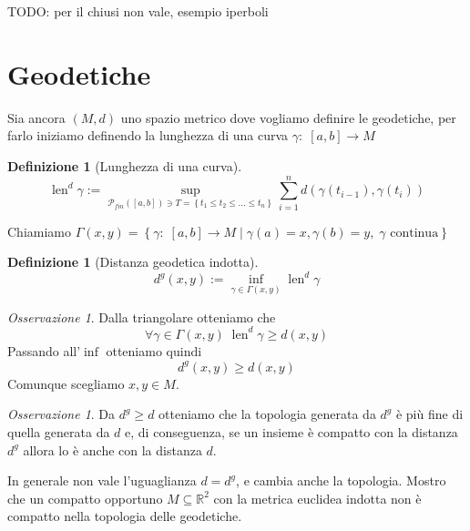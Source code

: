 \documentclass[a4paper,10pt]{article}
\newcounter{counter1}
\theoremstyle{plain}
\theoremstyle{definition}
\newtheorem{mydef}[counter1]{Definizione}
\theoremstyle{remark}
\newtheorem{myoss}[counter1]{Osservazione}
\newcommand{\set}[1]{\left\{#1\right\}}
\newcommand{\pa}[1]{\left(#1\right)}
\newcommand{\bra}[1]{\left[#1\right]}
\DeclareMathOperator{\len}{len}
\begin{document}
TODO: per il chiusi non vale, esempio iperboli


\section{Geodetiche}

Sia ancora $(M,d)$ uno spazio metrico dove vogliamo definire le
geodetiche, per farlo iniziamo definendo la lunghezza di una curva
$\gamma :\; \bra{a,b} \to M$
\begin{mydef}[Lunghezza di una curva]
  \[ \len^d \gamma := \sup _{\mathcal{P}_{fin}(\bra{a,b}) \ni T =
    \set{t_1 \le t_2 \le ... \le t_n}} \sum_{i=1}^n d\pa{
    \gamma\pa{t_{i-1}}, \gamma\pa{t_i}} \]
\end{mydef}

Chiamiamo $\Gamma (x,y) = \set{\gamma:\; \bra{a,b} \to M \mid
  \gamma(a) = x, \gamma(b) = y,\; \gamma \text{ continua}}$

\begin{mydef}[Distanza geodetica indotta]
  \[ d^g (x,y) := \inf _{\gamma \in \Gamma(x,y)} \len^d \gamma \]
\end{mydef}

\begin{myoss}
  Dalla triangolare otteniamo che 
  \[ \forall \gamma \in \Gamma(x,y) \; \len^d \gamma \ge d(x,y) \]
  Passando all'$\inf$ otteniamo quindi
  \[ d^g(x,y) \ge d(x,y) \]
  Comunque scegliamo $x,y \in M$.
\end{myoss}

\begin{myoss}
\label{oss:topologiagedoeticafine}
  Da $d^g \ge d$ otteniamo che la topologia generata da $d^g$ è più
  fine di quella generata da $d$ e, di conseguenza, se un insieme è
  compatto con la distanza $d^g$ allora lo è anche con la distanza
  $d$.
\end{myoss}

In generale non vale l'uguaglianza $d = d^g$, e cambia anche la
topologia. Mostro che un compatto opportuno $M \subseteq \mathbb{R}^2$
con la metrica euclidea indotta non è compatto nella topologia delle
geodetiche.
\end{document}
